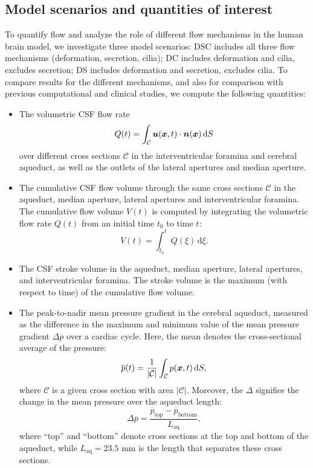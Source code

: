 \documentclass{template}
\begin{document}
\subsection{Model scenarios and quantities of interest}
To quantify flow and analyze the role of different flow mechanisms
in the human brain model, we investigate three model scenarios:
DSC includes all three flow mechanisms (deformation, secretion, cilia);
DC includes deformation and cilia, excludes secretion;
DS includes deformation and secretion, excludes cilia.
To compare results for the different mechanisms, and
also for comparison with previous computational and clinical studies,
we compute the following quantities:
\begin{itemize}
    \item The volumetric CSF flow rate
    $$ Q(t) = \int_{\mathcal{C}}\bm{u}(\bm{x}, t)\cdot\bm{n}(\bm{x})\,\mathrm dS $$
    over different cross sections $\mathcal{C}$ in the interventricular foramina and cerebral aqueduct, 
    as well as the outlets of the lateral apertures and median aperture.

    \item The cumulative CSF flow volume through the same cross sections
    $\mathcal{C}$ in the aqueduct,
    median aperture, lateral apertures
    and interventricular foramina. The cumulative flow volume $V(t)$
    is computed by integrating the volumetric flow rate $Q(t)$
    from an initial time $t_0$ to time $t$:
    $$ V(t) = \int_{t_0}^{t} Q(\xi)\,\mathrm d\xi.$$

    \item The CSF stroke volume in the aqueduct, median aperture, lateral apertures,
    and interventricular foramina. The stroke volume is the maximum (with respect
    to time) of the cumulative flow volume.

    \item The peak-to-nadir mean pressure gradient in the cerebral aqueduct,
    measured as the difference in the maximum and minimum value of
    the mean pressure gradient $\Delta \overline{p}$ over a cardiac cycle.
    Here, the mean denotes the cross-sectional average of the pressure:
    $$\overline{p}(t) = \frac{1}{|\mathcal{C}|}\int_{\mathcal{C}} p(\bm{x}, t)\,\mathrm dS,$$
    where $\mathcal{C}$ is a given cross section with area $|\mathcal{C}|$.
    Moreover, the $\Delta$ signifies the change in the mean pressure over the
    aqueduct length:
    $$ \Delta \overline{p} = \frac{\overline{p}_{\mathrm{top}} - \overline{p}_{\mathrm{bottom}}}{L_{\mathrm{aq}}},$$
    where ``top'' and ``bottom'' denote cross sections at the top and bottom of the aqueduct,
    while $L_{\mathrm{aq}} = 23.5$ mm is the length that separates these cross sections.


\end{itemize}
\end{document}
